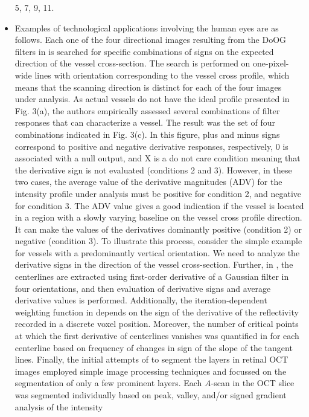 \documentclass[11pt]{book}
\begin{document}
\begin{itemize}
5, 7, 9, 11.
\item Examples of technological applications involving the human eyes are
as follows. Each one of the four directional images resulting from
the DoOG filters in \cite{mendonca2006segmentation}
is searched for specific combinations of signs on the expected direction
of the vessel cross-section. The search is performed on one-pixel-wide
lines with orientation corresponding to the vessel cross profile,
which means that the scanning direction is distinct for each of the
four images under analysis. As actual vessels do not have the ideal
profile presented in Fig. 3(a), the authors empirically assessed several
combinations of filter responses that can characterize a vessel. The
result was the set of four combinations indicated in Fig. 3(c). In
this figure, plus and minus signs correspond to positive and negative
derivative responses, respectively, 0 is associated with a null output,
and X is a do not care condition meaning that the derivative sign
is not evaluated (conditions 2 and 3). However, in these two cases,
the average value of the derivative magnitudes (ADV) for the intensity
profile under analysis must be positive for condition 2, and negative
for condition 3. The ADV value gives a good indication if the vessel
is located in a region with a slowly varying baseline on the vessel
cross profile direction. It can make the values of the derivatives
dominantly positive (condition 2) or negative (condition 3). To illustrate
this process, consider the simple example for vessels with a predominantly
vertical orientation. We need to analyze the derivative signs in the
direction of the vessel cross-section. Further, in \cite{fraz2012approach},
the centerlines are extracted using first-order derivative of a Gaussian
filter in four orientations, and then evaluation of derivative signs
and average derivative values is performed. Additionally, the iteration-dependent
weighting function in \cite{de2017automated}
depends on the sign of the derivative of the reflectivity recorded
in a discrete voxel position. Moreover, the number of critical points
at which the first derivative of centerlines vanishes was quantified
in \cite{khansari2017method}
for each centerline based on frequency of changes in sign of the slope
of the tangent lines. Finally, the initial attempts of \cite{chakravarty2018supervised}
to segment the layers in retinal OCT images employed simple image
processing techniques and focussed on the segmentation of only a few
prominent layers. Each $A$-scan in the OCT slice was segmented individually
based on peak, valley, and/or signed gradient analysis of the intensity

\end{itemize}
\end{document}
